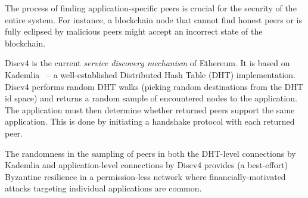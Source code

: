 The process of finding application-specific peers is crucial for the security of the entire system. For instance, a blockchain node that cannot find honest peers or is fully eclipsed by malicious peers might accept an incorrect state of the blockchain. 


 Discv4 is the current \textit{service discovery mechanism} of Ethereum. It is based on Kademlia~\cite{maymounkov2002kademlia} – a well-established Distributed Hash Table (DHT) implementation. Discv4 performs random DHT walks (picking random destinations from the DHT id space) and returns a random sample of encountered nodes to the application. The application must then determine whether returned peers support the same application. This is done by initiating a handshake protocol with each returned peer. 


The randomness in the sampling of peers in both the DHT-level connections by Kademlia and application-level connections by Discv4 provides (a best-effort) Byzantine resilience in a permission-less network where financially-motivated attacks targeting individual applications are common.
 

